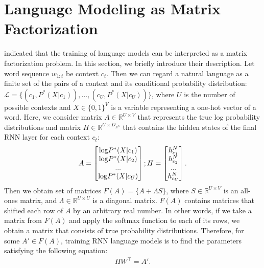 \documentclass[11pt,a4paper]{article}
\begin{document}
\section{Language Modeling as Matrix Factorization}
\label{sec:mos}
 indicated that the training of language models can be interpreted as a matrix factorization problem.
In this section, we briefly introduce their description.
Let word sequence $w_{1:t}$ be context $c_t$.
Then we can regard a natural language as a finite set of the pairs of a context and its conditional probability distribution: $\mathcal{L} = \{ (c_1, P^{*}(X|c_1)), ..., (c_U, P^{*}(X|c_U) ) \}$, where $U$ is the number of possible contexts and $X \in \{0, 1\}^{V}$ is a variable representing a one-hot vector of a word.
Here, we consider matrix $A \in \mathbb{R}^{U \times V}$ that represents the true log probability distributions and matrix $H \in \mathbb{R}^{U \times D_{h^N}}$ that contains the hidden states of the final RNN layer for each context $c_t$:
\begin{align}
  \label{eq:true_logp}
  A
  = 
  \begin{bmatrix}
  {\rm log} P^{*}(X | c_1) \\
  {\rm log} P^{*}(X | c_2) \\
  ... \\
  {\rm log} P^{*}(X | c_U) \\
  \end{bmatrix};
  H = 
  \begin{bmatrix}
  h^{N}_{c_1} \\
  h^{N}_{c_2} \\
  ... \\
  h^{N}_{c_U} \\
  \end{bmatrix}.
\end{align}
Then we obtain set of matrices $F(A) = \{A + \Lambda S \}$, where $S \in \mathbb{R}^{U \times V}$ is an all-ones matrix, and $\Lambda \in \mathbb{R}^{U \times U}$ is a diagonal matrix.
$F(A)$ contains matrices that shifted each row of $A$ by an arbitrary real number.
In other words, if we take a matrix from $F(A)$ and apply the softmax function to each of its rows, we obtain a matrix that consists of true probability distributions.
Therefore, for some $A' \in F(A)$, training RNN language models is to find the parameters satisfying the following equation:
\begin{align}
  H W^{\top} = A'. \label{eq:factorization}
\end{align}
\end{document}
